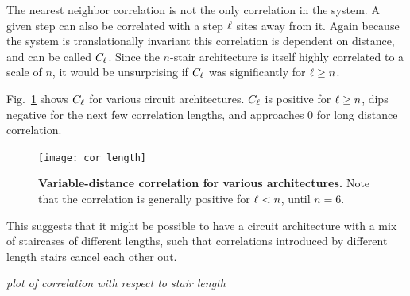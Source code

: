 The nearest neighbor correlation is not the only correlation in the system. A given step can also be correlated with a step $\ell$ sites away from it. Again because the system is translationally invariant this correlation is dependent on distance, and can be called $C_\ell$. Since the $n$-stair architecture is itself highly correlated to a scale of $n$, it would be unsurprising if $C_\ell$ was significantly for $\ell\ge n$. 

Fig.~\ref{fig:cor_length} shows $C_\ell$ for various circuit architectures. $C_\ell$ is positive for $\ell\ge n$, dips negative for the next few correlation lengths, and approaches 0 for long distance correlation.
\begin{figure}
	\centering
	\texttt{[image: cor\_length]}
	\caption{\textbf{Variable-distance correlation for various architectures.} Note that the correlation is generally positive for $\ell<n$, until $n=6$.}
	\label{fig:cor_length}
\end{figure}
This suggests that it might be possible to have a circuit architecture with a mix of staircases of different lengths, such that correlations introduced by different length stairs cancel each other out.

\emph{plot of correlation with respect to stair length}